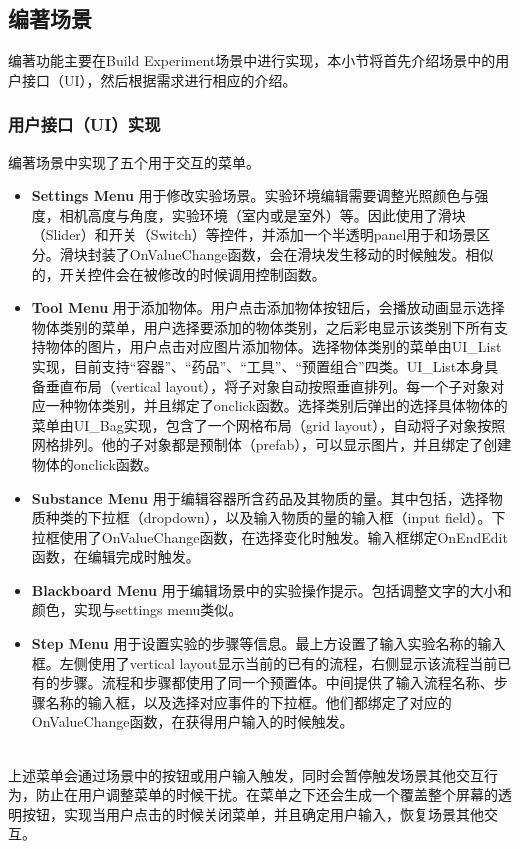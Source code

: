 \subsection{编著场景}
编著功能主要在Build Experiment场景中进行实现，本小节将首先介绍场景中的用户接口（UI），然后根据需求进行相应的介绍。

\subsubsection{用户接口（UI）实现}
编著场景中实现了五个用于交互的菜单。

\begin{itemize}
    \item \textbf{Settings Menu}
用于修改实验场景。实验环境编辑需要调整光照颜色与强度，相机高度与角度，实验环境（室内或是室外）等。因此使用了滑块（Slider）和开关（Switch）等控件，并添加一个半透明panel用于和场景区分。滑块封装了OnValueChange函数，会在滑块发生移动的时候触发。相似的，开关控件会在被修改的时候调用控制函数。
    
    \item \textbf{Tool Menu}
用于添加物体。用户点击添加物体按钮后，会播放动画显示选择物体类别的菜单，用户选择要添加的物体类别，之后彩电显示该类别下所有支持物体的图片，用户点击对应图片添加物体。选择物体类别的菜单由UI\_List实现，目前支持“容器”、“药品”、“工具”、“预置组合”四类。UI\_List本身具备垂直布局（vertical layout），将子对象自动按照垂直排列。每一个子对象对应一种物体类别，并且绑定了onclick函数。选择类别后弹出的选择具体物体的菜单由UI\_Bag实现，包含了一个网格布局（grid layout），自动将子对象按照网格排列。他的子对象都是预制体（prefab），可以显示图片，并且绑定了创建物体的onclick函数。
    
    \item \textbf{Substance Menu}
用于编辑容器所含药品及其物质的量。其中包括，选择物质种类的下拉框（dropdown），以及输入物质的量的输入框（input field）。下拉框使用了OnValueChange函数，在选择变化时触发。输入框绑定OnEndEdit函数，在编辑完成时触发。

    \item \textbf{Blackboard Menu}
用于编辑场景中的实验操作提示。包括调整文字的大小和颜色，实现与settings menu类似。
    
    \item \textbf{Step Menu}
用于设置实验的步骤等信息。最上方设置了输入实验名称的输入框。左侧使用了vertical layout显示当前的已有的流程，右侧显示该流程当前已有的步骤。流程和步骤都使用了同一个预置体。中间提供了输入流程名称、步骤名称的输入框，以及选择对应事件的下拉框。他们都绑定了对应的OnValueChange函数，在获得用户输入的时候触发。
\end{itemize}
~\\
\indent    	上述菜单会通过场景中的按钮或用户输入触发，同时会暂停触发场景其他交互行为，防止在用户调整菜单的时候干扰。在菜单之下还会生成一个覆盖整个屏幕的透明按钮，实现当用户点击的时候关闭菜单，并且确定用户输入，恢复场景其他交互。

